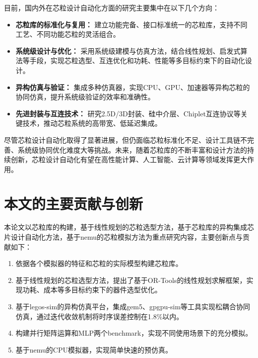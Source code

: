 \documentclass[bachelor]{thesis-uestc}
\begin{document}
目前，国内外在芯粒设计自动化方面的研究主要集中在以下几个方向：
\begin{itemize}
    \item \textbf{芯粒库的标准化与复用：} 建立功能完备、接口标准统一的芯粒库，支持不同工艺、不同功能芯粒的灵活组合。
    \item \textbf{系统级设计与优化：} 采用系统级建模与仿真方法，结合线性规划、启发式算法等手段，实现芯粒选型、互连优化和功耗、性能等多目标约束下的自动化设计。
    \item \textbf{异构仿真与验证：} 集成多种仿真器，实现CPU、GPU、加速器等异构芯粒的协同仿真，提升系统级验证的效率和准确性。
    \item \textbf{先进封装与互连技术：} 研究2.5D/3D封装、硅中介层、Chiplet互连协议等关键技术，推动芯粒系统的高带宽、低延迟集成。
\end{itemize}

尽管芯粒设计自动化取得了显著进展，但仍面临芯粒标准化不足、设计工具链不完善、系统级协同优化难度大等挑战。未来，随着芯粒库的不断丰富和设计方法的持续创新，芯粒设计自动化有望在高性能计算、人工智能、云计算等领域发挥更大作用。

\section{本文的主要贡献与创新}
本论文以芯粒库的构建，基于线性规划的芯粒选型方法，基于芯粒库的异构集成芯片设计自动化方法，基于nemu的芯粒模拟方法为重点研究内容，主要创新点与贡献如下：

\begin{enumerate}
\item 依据各个模拟器的特征和芯粒的实际模型构建芯粒库。

\item 基于线性规划的芯粒选型方法，提出了基于OR-Tools的线性规划求解框架，实现功耗、成本等多目标约束下的器件选型优化。

\item 基于legos-sim的异构仿真平台，集成gem5、gpgpu-sim等工具实现松耦合协同仿真，通过迭代收敛机制将时序误差控制在1.8\%以内。

\item 构建并行矩阵运算和MLP两个benchmark，实现不同使用场景下的充分模拟。

\item 基于nemu的CPU模拟器，实现简单快速的预仿真。
\end{enumerate}
\end{document}
